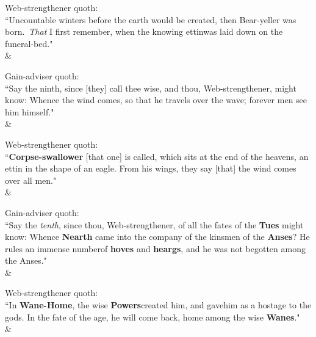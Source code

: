 \begin{Rightside}
\begin{astanza}%
\bv Web-strengthener quoth: \\ “Uncountable winters before the earth would be created, then Bear-yeller was born. \emph{That} I first remember, when the knowing ettin\footnotemark[60] was laid down on the funeral-bed\footnotemark[61]." \\
\&\end{astanza}%

\begin{astanza}%
\bv Gain-adviser quoth: \\ “Say the ninth, since [they] call thee wise, and thou, Web-strengthener, might know: Whence the wind comes, so that he travels over the wave; forever men see him himself.\footnotemark[65]" \\
\&\end{astanza}%

\begin{astanza}%
\bv Web-strengthener quoth: \\ “\textbf{Corpse-swallower} [that one] is called, which sits at the end of the heavens, an ettin in the shape of an eagle. From his wings, they say [that] the wind comes over all men." \\
\&\end{astanza}%

\begin{astanza}%
\bv Gain-adviser quoth: \\ “Say the \emph{tenth}, since thou, Web-strengthener, of all the fates of the \textbf{Tues} might know: Whence \textbf{Nearth} came into the company of the kinsmen of the \textbf{Anses}? He rules an immense number\footnotemark[68] of \textbf{hoves} and \textbf{heargs}, and he was not begotten among the Anses." \\
\&\end{astanza}%

\begin{astanza}%
\bv Web-strengthener quoth: \\ “In \textbf{Wane-Home}, the wise \textbf{Powers}\footnotemark[69] created him, and gave\footnotemark[70] him as a hostage to the gods. In the fate of the age, he will come back, home among the wise \textbf{Wanes}." \\
\&\end{astanza}%


\end{Rightside}
